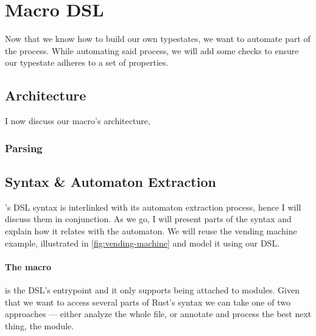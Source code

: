 \section{Macro DSL}\label{sec:macro-dsl}

Now that we know how to build our own typestates,
we want to automate part of the process.
While automating said process, we will add some checks to ensure our typestate adheres to a set of properties.


\subsection{Architecture}\label{sec:macro-dsl:architecture}

I now discuss our macro's architecture,

\subsubsection{Parsing}

\subsection{Syntax \& Automaton Extraction}\label{sec:macro-dsl:syntax}

's DSL syntax is interlinked with its automaton extraction process,
hence I will discuss them in conjunction.
As we go, I will present parts of the syntax and explain how it relates with the automaton.
We will reuse the vending machine example, illustrated in \autoref{fig:vending-machine} and model it using our DSL.

\paragraph{The  macro} is the DSL's entrypoint and
it only supports being attached to modules.
Given that we want to access several parts of Rust's syntax  we can take one of two approaches ---
either analyze the whole file, or annotate and process the best next thing, the module.

